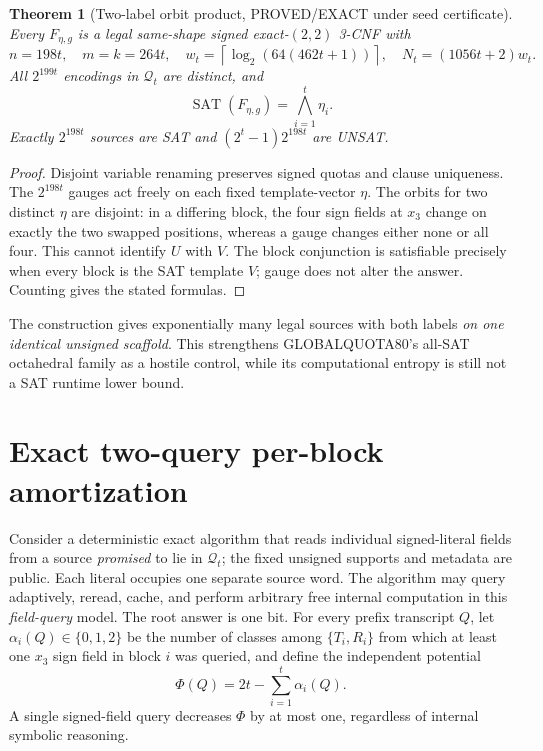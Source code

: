 \documentclass[11pt]{article}
\newtheorem{theorem}{Theorem}
\begin{document}
\begin{theorem}[Two-label orbit product, PROVED/EXACT under seed certificate]
Every $F_{\eta,g}$ is a legal same-shape signed exact-$(2,2)$ 3-CNF with
\[
n=198t,\quad m=k=264t,\quad
w_t=\left\lceil\log_2(64(462t+1))\right\rceil,\quad
N_t=(1056t+2)w_t.
\]
All $2^{199t}$ encodings in $\mathcal Q_t$ are distinct, and
\[
\operatorname{SAT}(F_{\eta,g})=\bigwedge_{i=1}^{t}\eta_i.
\]
Exactly $2^{198t}$ sources are SAT and $(2^t-1)2^{198t}$ are UNSAT.
\end{theorem}
\begin{proof}
Disjoint variable renaming preserves signed quotas and clause uniqueness. The $2^{198t}$ gauges act freely on each fixed template-vector $\eta$. The orbits for two distinct $\eta$ are disjoint: in a differing block, the four sign fields at $x_3$ change on exactly the two swapped positions, whereas a gauge changes either none or all four. This cannot identify $U$ with $V$. The block conjunction is satisfiable precisely when every block is the SAT template $V$; gauge does not alter the answer. Counting gives the stated formulas.
\end{proof}
The construction gives exponentially many legal sources with both labels \emph{on one identical unsigned scaffold}. This strengthens GLOBALQUOTA80's all-SAT octahedral family as a hostile control, while its computational entropy is still not a SAT runtime lower bound.

\section{Exact two-query per-block amortization}
Consider a deterministic exact algorithm that reads individual signed-literal fields from a source \emph{promised} to lie in $\mathcal Q_t$; the fixed unsigned supports and metadata are public. Each literal occupies one separate source word. The algorithm may query adaptively, reread, cache, and perform arbitrary free internal computation in this \emph{field-query} model. The root answer is one bit. For every prefix transcript $Q$, let $\alpha_i(Q)\in\{0,1,2\}$ be the number of classes among $\{T_i,R_i\}$ from which at least one $x_3$ sign field in block $i$ was queried, and define the independent potential
\[
\Phi(Q)=2t-\sum_{i=1}^t\alpha_i(Q).
\]
A single signed-field query decreases $\Phi$ by at most one, regardless of internal symbolic reasoning.
\end{document}
